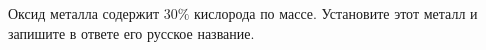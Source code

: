 
Оксид
металла содержит 30$\%$ кислорода по массе. Установите этот металл и запишите в ответе его русское название.



